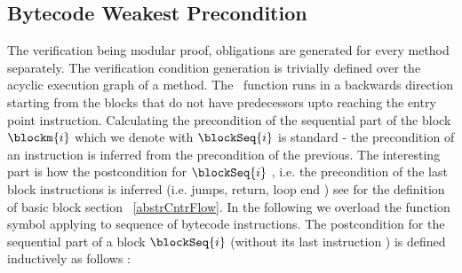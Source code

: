 

\subsection{Bytecode Weakest Precondition}\label{wpGraph}

The verification being modular proof, obligations are generated for every method separately. The verification condition generation 
is trivially defined over the acyclic execution graph of a method. 
The \wpi \ function runs in a backwards  direction starting from the blocks that do not have predecessors upto reaching the entry point
 instruction.  Calculating the precondition of the sequential part of the block $\blockm{i}$ 
 which we denote with  $\blockSeq{i}$  is standard - the precondition of an instruction  is inferred from the precondition of the previous.
The  interesting part is how the postcondition  for $\blockSeq{i}$ , i.e. the precondition of the last block instructions is inferred 
(i.e. jumps, return, loop end ) see for the definition of basic block section ~\ref{abstrCntrFlow}.  In the following we overload the function 
symbol \wpi applying to sequence of bytecode instructions.
The postcondition for the sequential part of a block  $\blockSeq{i}$ (without its last instruction )   is defined inductively 
 as follows :
